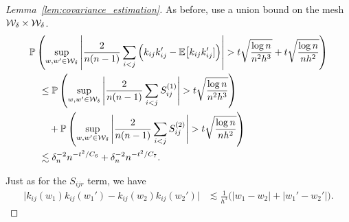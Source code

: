 \begin{proof}[Lemma~\ref{lem:covariance_estimation}]

  As before, use a union bound
  on the mesh $\mathcal{W}_\delta \times \mathcal{W}_\delta$.
  \begin{align*}
    &\mathbb{P}\left(
      \sup_{w,w' \in \mathcal{W}_\delta}
      \left|
      \frac{2}{n(n-1)}
      \sum_{i<j}
      \Big(
        k_{i j} k_{i j}'
        - \mathbb{E}\big[k_{i j} k_{i j}']
      \Big)
      \right|
      > t \sqrt{\frac{\log n}{n^2h^3}}
      + t \sqrt{\frac{\log n}{n h^2}}
    \right) \\
    &\quad\leq
    \mathbb{P}\left(
      \sup_{w,w' \in \mathcal{W}_\delta}
      \Bigg|
      \frac{2}{n(n-1)}
      \sum_{i<j}
      S_{i j}^{(1)}
      \Bigg|
      > t
      \sqrt{\frac{\log n}{n^2h^3}}
    \right) \\
    &\qquad+
    \mathbb{P}\left(
      \sup_{w,w' \in \mathcal{W}_\delta}
      \Bigg|
      \frac{2}{n(n-1)}
      \sum_{i<j}
      S_{i j}^{(2)}
      \Bigg|
      > t
      \sqrt{\frac{\log n}{n h^2}}
    \right) \\
    &\quad\lesssim
    \delta_n^{-2} n^{-t^2 / C_6}
    + \delta_n^{-2} n^{-t^2 / C_7}.
  \end{align*}


  Just as for the $S_{i j r}$ term,
  we have
  \begin{align*}
    \big|
    k_{i j}(w_1)
    k_{i j}(w_1')
    - k_{i j}(w_2)
    k_{i j}(w_2')
    \big|
    &\lesssim
    \frac{1}{h^3}
    \Big(
      |w_1 - w_2|
      + |w_1' - w_2'|
    \Big).
  \end{align*}



\end{proof}

